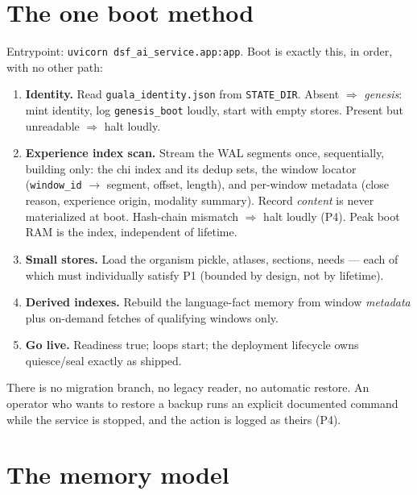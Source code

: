 \documentclass[11pt]{article}
\begin{document}
\section{The one boot method}\label{sec:boot}

Entrypoint: \texttt{uvicorn dsf\_ai\_service.app:app}. Boot is exactly this,
in order, with no other path:

\begin{enumerate}[nosep]
  \item \textbf{Identity.} Read \texttt{guala\_identity.json} from
        \texttt{STATE\_DIR}. Absent $\Rightarrow$ \emph{genesis}: mint
        identity, log \texttt{genesis\_boot} loudly, start with empty
        stores. Present but unreadable $\Rightarrow$ halt loudly.
  \item \textbf{Experience index scan.} Stream the WAL segments once,
        sequentially, building only: the chi index and its dedup sets, the
        window locator (\texttt{window\_id} $\to$ segment, offset, length),
        and per-window metadata (close reason, experience origin, modality
        summary). Record \emph{content} is never materialized at boot.
        Hash-chain mismatch $\Rightarrow$ halt loudly (P4). Peak boot RAM is
        the index, independent of lifetime.
  \item \textbf{Small stores.} Load the organism pickle, atlases, sections,
        needs — each of which must individually satisfy P1 (bounded by
        design, not by lifetime).
  \item \textbf{Derived indexes.} Rebuild the language-fact memory from
        window \emph{metadata} plus on-demand fetches of qualifying windows
        only.
  \item \textbf{Go live.} Readiness true; loops start; the deployment
        lifecycle owns quiesce/seal exactly as shipped.
\end{enumerate}

There is no migration branch, no legacy reader, no automatic restore. An
operator who wants to restore a backup runs an explicit documented command
while the service is stopped, and the action is logged as theirs (P4).

\section{The memory model}\label{sec:memory}
\end{document}
